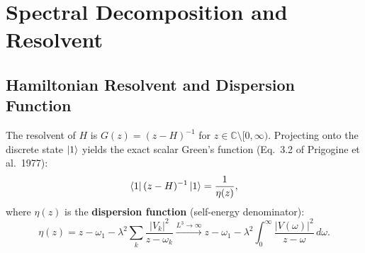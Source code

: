 \documentclass[11pt,a4paper]{article}
\begin{document}
\section{Spectral Decomposition and Resolvent}

\subsection{Hamiltonian Resolvent and Dispersion Function}
The resolvent of $H$ is $G(z) = (z - H)^{-1}$ for $z \in \mathbb{C} \setminus [0, \infty)$. Projecting onto the discrete state $\ket{1}$ yields the exact scalar Green's function (Eq.~3.2 of Prigogine et al.\ 1977):
\begin{equation}
\bra{1} (z - H)^{-1} \ket{1} = \frac{1}{\eta(z)},
\end{equation}
where $\eta(z)$ is the \textbf{dispersion function} (self-energy denominator):
\begin{equation}
\eta(z) = z - \omega_1 - \lambda^2 \sum_k \frac{|V_k|^2}{z - \omega_k} \xrightarrow{L^3 \to \infty} z - \omega_1 - \lambda^2 \int_0^\infty \frac{|V(\omega)|^2}{z - \omega} \, d\omega.
\end{equation}
\end{document}

